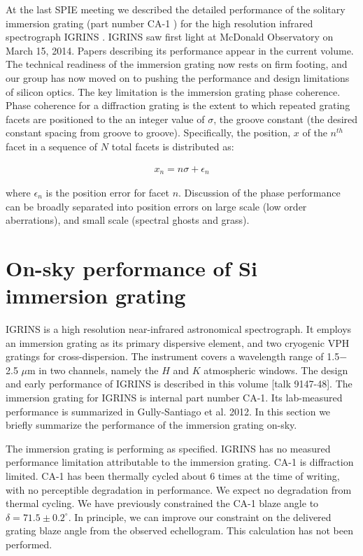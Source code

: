 \documentclass[]{spie}  %
\begin{document}
At the last SPIE meeting we described the detailed performance of the solitary immersion grating (part number CA-1 \cite{2012SPIE.8450E..2SG}) for the high resolution infrared spectrograph IGRINS \cite{2010SPIE.7735E..54Y}.  IGRINS saw first light at McDonald Observatory on March 15, 2014.  Papers describing its performance appear in the current volume.  The technical readiness of the immersion grating now rests on firm footing, and our group has now moved on to pushing the performance and design limitations of silicon optics.  The key limitation is the immersion grating phase coherence.  Phase coherence for a diffraction grating is the extent to which repeated grating facets are positioned to the an integer value of $\sigma$, the groove constant (the desired constant spacing from groove to groove).  Specifically, the position, $x$ of the $n^{th}$ facet in a sequence of $N$ total facets is distributed as: 

\begin{eqnarray}
x_n = n\sigma + \epsilon_n  \label{eqn:Epsilon}
\end{eqnarray}

where $\epsilon_n$ is the position error for facet $n$.  Discussion of the phase performance can be broadly separated into position errors on large scale (low order aberrations), and small scale (spectral ghosts and grass).

\section{On-sky performance of Si immersion grating}
IGRINS \cite{2010SPIE.7735E..54Y} is a high resolution near-infrared astronomical spectrograph.  It employs an immersion grating as its primary dispersive element, and two cryogenic VPH gratings for cross-dispersion.  The instrument covers a wavelength range of 1.5$-$2.5 $\mu$m in two channels, namely the $H$ and $K$ atmospheric windows.  The design and early performance of IGRINS is described in this volume [talk 9147-48]\cite{2014SPIE.CHANPARK.IGRINS}.  The immersion grating for IGRINS is internal part number CA-1.  Its lab-measured performance is summarized in Gully-Santiago et al. 2012\cite{2012SPIE.8450E..2SG}.  In this section we briefly summarize the performance of the immersion grating on-sky.

The immersion grating is performing as specified.  IGRINS has no measured performance limitation attributable to the immersion grating.  CA-1 is diffraction limited.  CA-1 has been thermally cycled about 6 times at the time of writing, with no perceptible degradation in performance.  We expect no degradation from thermal cycling.  We have previously constrained the CA-1 blaze angle to $\delta = 71.5\pm 0.2^\circ$.  In principle, we can improve our constraint on the delivered grating blaze angle from the observed echellogram.  This calculation has not been performed.
\end{document}
